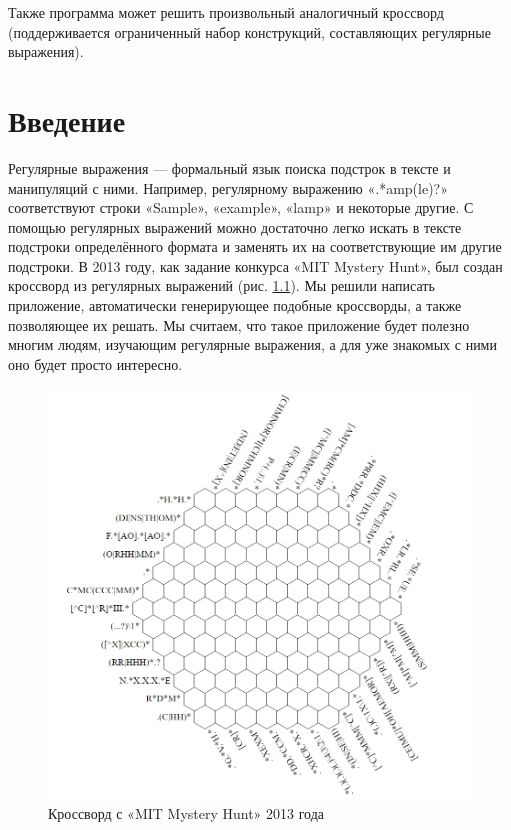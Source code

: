 \documentclass[12pt]{report}
\begin{document}
    Также программа может решить произвольный аналогичный кроссворд (поддерживается ограниченный набор конструкций, составляющих регулярные выражения).


    \newpage %
\renewcommand*\contentsname{Кроссворды из регулярных выражений }
\tableofcontents
    \newpage %
\chapter{Введение}
Регулярные выражения — формальный язык поиска подстрок в тексте и манипуляций с ними. Например, регулярному выражению «.*amp(le)?» соответствуют строки «Sample», «example», «lamp» и некоторые другие. С помощью регулярных выражений можно достаточно легко искать в тексте подстроки определённого формата и заменять их на соответствующие им другие подстроки. В 2013 году, как задание конкурса «MIT Mystery Hunt», был создан кроссворд из регулярных выражений (рис. \ref{pic:MITHex}). Мы решили написать приложение, автоматически генерирующее подобные кроссворды, а также позволяющее их решать. Мы считаем, что такое приложение будет полезно многим людям, изучающим регулярные выражения, а для уже знакомых с ними оно будет просто интересно.
 \begin{figure}[ht!]
 \centering
    \includegraphics[width=.7\textwidth]{MITHexagon.png}
    \caption{\label{pic:MITHex}Кроссворд с «MIT Mystery Hunt» 2013 года}
\end{figure}
\end{document}
